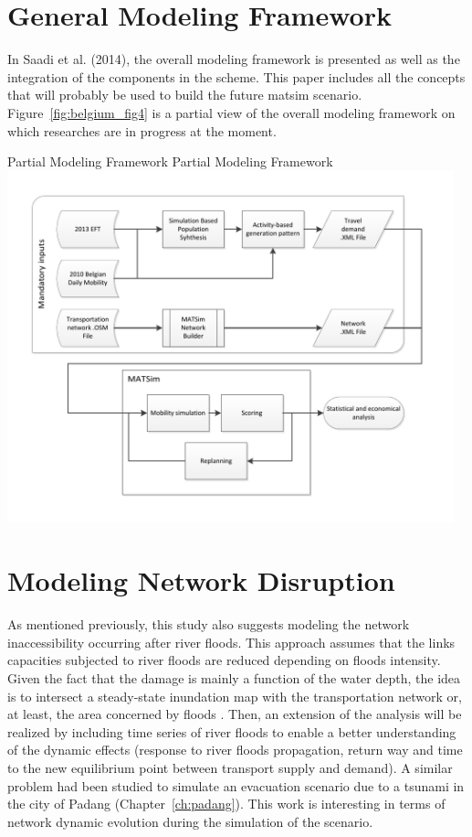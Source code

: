 \section{General Modeling Framework}
In Saadi et al. (2014), the overall modeling framework is presented as well as the integration of the components in the scheme. 
This paper includes all the concepts that will probably be used to build the future \gls{matsim} scenario. 
Figure~\ref{fig:belgium_fig4} is a partial view of the overall modeling framework on which researches are in progress at the moment.

\createfigure%
{Partial Modeling Framework}%
{Partial Modeling Framework}%
{\label{fig:belgium_fig4}}%
{\includegraphics[width=0.97\textwidth, angle=0]{scenarios/figures/belgium_fig4.pdf}}%
{}

\section{Modeling Network Disruption}
As mentioned previously, this study also suggests modeling the network inaccessibility occurring after river floods. 
This approach assumes that the links capacities subjected to river floods are reduced depending on floods intensity. 
Given the fact that the damage is mainly a function of the water depth, the idea is to intersect a steady-state inundation map with the transportation network or, at least, the area concerned by floods \citep[][]{SaadiEtAl_ICTTE_2014}. 
Then, an extension of the analysis will be realized by including time series of river floods to enable a better understanding of the dynamic effects (\eg response to river floods propagation, return way and time to the new equilibrium point between transport supply and demand). 
A similar problem had been studied to simulate an evacuation scenario due to a tsunami in the city of Padang \citep[][]{LaemmelGretherNagel2009TimeDependentNetworks} (Chapter~\ref{ch:padang}). 
This work is interesting in terms of network dynamic evolution during the simulation of the scenario.

